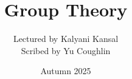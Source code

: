\documentclass{article}
\begin{document}
\title{Group Theory}
\author{Lectured by Kalyani Kansal \\
Scribed by Yu Coughlin}
\date{Autumn 2025}

\maketitle

\tableofcontents
\end{document}
